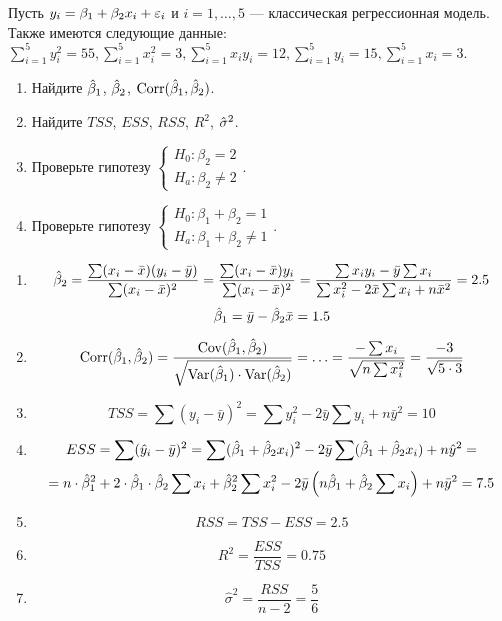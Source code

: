 \begin{problem}
Пусть $y_i = \beta_1 + \beta_2 x_i + \varepsilon_i$ и $i = 1, \dots, 5$ — классическая регрессионная модель. 
Также имеются следующие данные: $\sum_{i=1}^5 y_i^2 = 55, \sum_{i=1}^5 x_i^2 = 3, 
\sum_{i=1}^5 x_iy_i = 12, \sum_{i=1}^5 y_i = 15, \sum_{i=1}^5 x_i = 3$.

\begin{enumerate}
\item Найдите $\hat{\beta}_1$, $\hat{\beta}_2$, $\operatorname{Corr}(\hat{\beta}_1, \hat{\beta}_2)$.
\item Найдите $TSS$, $ESS$, $RSS$, $R^2$, $\hat{\sigma}^2$.
\item Проверьте гипотезу $\begin{cases}  H_0: \beta_2 = 2  \\ H_a: \beta_2 \not= 2 \end{cases}$.
\item Проверьте гипотезу $\begin{cases}  H_0: \beta_1 + \beta_2 = 1  \\ H_a: \beta_1 + \beta_2 \not= 1 \end{cases}$.
\end{enumerate}

\begin{sol}
\begin{enumerate}
\item
\[\hat{\beta}_2 = \frac{\sum (x_i - \bar{x}) (y_i - \bar{y})}{\sum (x_i-\bar{x})^2} = \frac{\sum (x_i - \bar{x})y_i}{\sum (x_i-\bar{x})^2} = \frac{\sum x_i y_i - \bar{y} \sum x_i}{\sum x_i^2 - 2 \bar{x} \sum x_i + n \bar{x}^2}=2.5\]
\[\hat{\beta}_1 = \bar{y} - \hat{\beta}_2 \bar{x} = 1.5 \]
\item
\[
  \operatorname{Corr}(\hat{\beta}_1, \hat{\beta}_2) = \frac{\operatorname{Cov} (\hat{\beta}_1, \hat{\beta}_2)}{\sqrt{\operatorname{Var} (\hat{\beta}_1)\cdot \operatorname{Var} (\hat{\beta}_2)}}= \ldots =
\frac{-\sum x_i}{\sqrt{n \sum x_i^2}} = \frac{-3}{\sqrt{5\cdot 3}}
\]
\item
\[TSS = \sum (y_i - \bar{y})^2 = \sum y_i^2 - 2 \bar{y} \sum y_i + n \bar{y}^2 = 10 \]
\item
\[ESS = \sum (\hat{y}_i - \bar{y})^2 = \sum (\hat{\beta}_1 + \hat{\beta}_2 x_i)^2 - 2\bar{y} \sum (\hat{\beta}_1 + \hat{\beta}_2 x_i) + n \hat{y}^2 = \]
\[ =n\cdot \hat{\beta}_1^2 +2 \cdot \hat{\beta}_1 \cdot \hat{\beta}_2 \sum x_i + \hat{\beta}_2^2 \sum x_i^2 - 2\bar{y} \left(n\hat{\beta}_1 + \hat{\beta}_2 \sum x_i \right) + n \bar{y}^2 = 7.5 \]
\item
\[RSS = TSS - ESS = 2.5 \]
\item
\[R^2 = \frac{ESS}{TSS} = 0.75 \]
\item
\[\hat{\sigma}^2 = \frac{RSS}{n - 2} = \frac{5}{6} \]
\end{enumerate}


\end{sol}
\end{problem}
